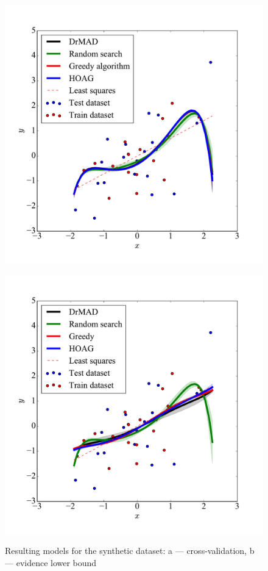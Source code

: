 \documentclass[smallcondensed]{svjour3}
\begin{document}
    \begin{figure}

    \begin{subfloat}[]{
    \includegraphics[width=0.5\linewidth]{plots/Fig_poly_cv.pdf}
    }
    \end{subfloat}
    \begin{subfloat}[]{
    \includegraphics[width=0.5\linewidth]{plots/Fig_poly_var.pdf}
    }
    \end{subfloat}

 \caption{Resulting models for the synthetic dataset: a --- cross-validation, b --- evidence lower bound}
  \label{fig:poly}
   
    \end{figure}
\end{document}
